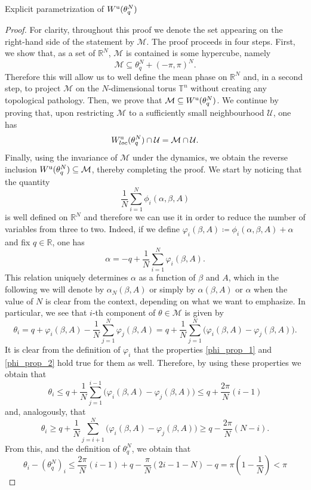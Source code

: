 \documentclass{article}
\theoremstyle{definition}
\newcommand{\jump}{\hfill\break}
\newcommand{\R}{\mathbb{R}}
\newcommand{\T}{\mathbb{T}}
\renewcommand{\u}{\textnormal{u}}
\begin{document}
\begin{section}{Explicit parametrization of $W^\u(\theta^N_q)$}
\begin{proof}
For clarity, throughout this proof we denote the set appearing on the right-hand side of the statement by $\mathcal{M}$. The proof proceeds in four steps. First, we show that, as a set of $\R^N$, $\mathcal{M}$ is contained is some hypercube, namely
$$\mathcal{M}\subseteq\theta^N_q+(-\pi,\pi)^N.$$
Therefore this will allow us to well define the mean phase on $\R^N$ and, in a second step, to project $\mathcal{M}$ on the $N$-dimensional torus $\T^n$ without creating any topological pathology. Then, we prove that $\mathcal{M}\subseteq W^\u(\theta^N_q)$. We continue by proving that, upon restricting $\mathcal{M}$ to a sufficiently small neighbourhood $\mathcal{U}$, one has
$$W^\u_{loc}(\theta^N_q)\cap\mathcal{U}=\mathcal{M}\cap\mathcal{U}.$$ Finally, using the invariance of $\mathcal{M}$ under the dynamics, we obtain the reverse inclusion $W^\u(\theta^N_q)\subseteq\mathcal{M}$, thereby completing the proof.
\jump\jump\noindent
{} We start by noticing that the quantity
$$\frac{1}{N}\sum_{i=1}^N\phi_i(\alpha,\beta,A)$$
is well defined on $\R^N$ and therefore we can use it in order to reduce the number of variables from three to two. Indeed, if we define $\varphi_i(\beta,A)\coloneqq\phi_i(\alpha,\beta,A)+\alpha$ and fix $q\in\R$, one has
\begin{equation}\label{3to2}
    \alpha=-q+\frac{1}{N}\sum_{i=1}^N\varphi_i(\beta,A).
\end{equation}
This relation uniquely determines $\alpha$ as a function of $\beta$ and $A$, which in the following we will denote by $\alpha_N(\beta,A)$ or simply by $\alpha(\beta,A)$ or $\alpha$ when the value of $N$ is clear from the context, depending on what we want to emphasize. In particular, we see that $i$-th component of $\theta\in\mathcal{M}$ is given by
$$\theta_i=q+\varphi_i(\beta,A)-\frac{1}{N}\sum_{j=1}^N\varphi_j(\beta,A)=q+\frac{1}{N}\sum_{j=1}^N\big(\varphi_i(\beta,A)-\varphi_j(\beta,A)\big).$$
It is clear from the definition of $\varphi_i$ that the properties \eqref{phi_prop_1} and \eqref{phi_prop_2} hold true for them as well. Therefore, by using these properties we obtain that
$$\theta_i\leq q+\frac{1}{N}\sum_{j=1}^{i-1}\big(\varphi_i(\beta,A)-\varphi_j(\beta,A)\big)\leq q+\frac{2\pi}{N}(i-1)$$
and, analogously, that
$$\theta_i\geq q+\frac{1}{N}\sum_{j=i+1}^{N}\big(\varphi_i(\beta,A)-\varphi_j(\beta,A)\big)\geq q-\frac{2\pi}{N}(N-i).$$
From this, and the definition of $\theta^N_q$, we obtain that
$$\theta_i-\left(\theta^N_q\right)_i\leq\frac{2\pi}{N}(i-1)+q-\frac{\pi}{N}(2i-1-N)-q=\pi\left(1-\frac{1}{N}\right)<\pi$$

\end{proof}
\end{section}
\end{document}
